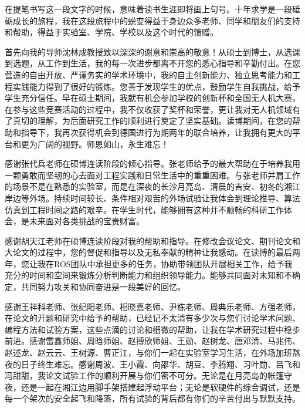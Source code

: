 

\begin{ack}
在提笔书写这一段文字的时候，意味着读书生涯即将画上句号。十年求学是一段砥砺成长的旅程，我在这段旅程中的蜕变得益于身边众多老师、同学和朋友们的支持和帮助，得益于实验室、学院、学校以及这个时代的馈赠。

首先向我的导师沈林成教授致以深深的谢意和崇高的敬意！从硕士到博士，从选课到选题，从工作到生活，我的每一次进步都离不开您的悉心指导和辛勤付出。在您营造的自由开放、严谨务实的学术环境中，我的自主创新能力、独立思考能力和工程实践能力得到了很好的锻炼。您善于发现学生的优点，鼓励学生自我挑战，给予学生充分信任。早在硕士期间，我就有机会参加学校的创新杯和全国无人机大赛，在参与这些竞赛活动的过程中，我不仅收获了奖杯和荣誉，更让我对无人机领域有了真切的理解，为后面研究工作的顺利进行奠定了坚实基础。读博期间，在您的帮助和指导下，我再次获得机会到德国进行为期两年的联合培养，让我拥有更大的平台和更为广阔的视野。师恩如山，永生难忘！

感谢张代兵老师在硕博连读阶段的倾心指导。张老师给予的最大帮助在于培养我用一颗勇敢而坚韧的心去面对工程实践和日常生活中的重重困难。与张老师并肩工作的场景不是在熟悉的实验室，而是在深夜的长沙月亮岛、清晨的吉安、初冬的湘江岸边等外场。持续时间较长、条件相对艰苦的外场试验让我体会到理论推导、算法仿真到工程时间之路的艰辛。在学生时代，能够拥有这种并不顺畅的科研工作体会，是未来面对各类挑战的宝贵财富。

感谢胡天江老师在硕博连读阶段对我的帮助和指导。在修改会议论文、期刊论文和大论文的过程中，您的督促和指导以及无私奉献的精神让我感动。在读博的最后两年，您让我在ROS团队中承担更多的任务，协助带领团队开展相关工作，给予我充分的时间和空间来锻炼分析判断能力和组织领导能力。能够共同面对未知和不确定，共同努力攻关和协同奋进是一段美好的回忆。


感谢王祥科老师、张纪阳老师、相晓嘉老师、尹栋老师、周典乐老师、方强老师，在论文的开题和研究中给予的帮助，已经记不太清有多少次与您们讨论学术问题、编程方法和试验方案，这些点滴的讨论和细微的帮助，让我在学术研究过程中稳步前进。感谢雷鑫师姐、周晗师姐、赵搏欣师姐、王勋、赵树龙、唐邓清、马兆伟、赵述龙、赵云云、王树源、曹正江，与你们一起在实验室学习生活，在外场加班熬夜的日子终生难忘。感谢周波、王小霞、向邵华、胡豆、李腾翔、习叶勋、吕飞和冯甜甜，我论文试验工作的顺利开展与你们密不可分。无论是在月亮岛的帐篷守夜，还是一起在湘江边用脚手架搭建起浮动平台；无论是软硬件的综合调试，还是每一个架次的安全起飞和降落，所有试验的背后都有你们的辛苦付出与默默支持。


\end{ack}
